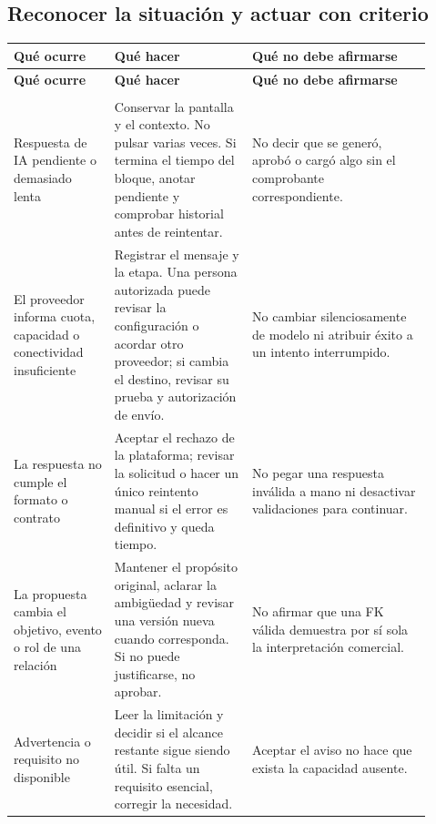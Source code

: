 \subsection{Reconocer la situación y actuar con criterio}
\begingroup
\fontsize{10}{12.5}\selectfont
\setlength{\tabcolsep}{5pt}
\renewcommand{\arraystretch}{1.15}
\begin{longtable}{@{}>{\RaggedRight\arraybackslash}p{0.22\linewidth}>{\RaggedRight\arraybackslash}p{0.3\linewidth}>{\RaggedRight\arraybackslash}p{0.39\linewidth}@{}}
\toprule
\textbf{Qué ocurre} & \textbf{Qué hacer} & \textbf{Qué no debe afirmarse} \\
\midrule
\endfirsthead
\toprule
\textbf{Qué ocurre} & \textbf{Qué hacer} & \textbf{Qué no debe afirmarse} \\
\midrule
\endhead
\midrule
\multicolumn{3}{r}{\footnotesize Continúa en la página siguiente}\\
\endfoot
\bottomrule
\endlastfoot
Respuesta de IA pendiente o demasiado lenta & Conservar la pantalla y el contexto. No pulsar varias veces. Si termina el tiempo del bloque, anotar pendiente y comprobar historial antes de reintentar. & No decir que se generó, aprobó o cargó algo sin el comprobante correspondiente. \\
\addlinespace[3pt]
El proveedor informa cuota, capacidad o conectividad insuficiente & Registrar el mensaje y la etapa. Una persona autorizada puede revisar la configuración o acordar otro proveedor; si cambia el destino, revisar su prueba y autorización de envío. & No cambiar silenciosamente de modelo ni atribuir éxito a un intento interrumpido. \\
\addlinespace[3pt]
La respuesta no cumple el formato o contrato & Aceptar el rechazo de la plataforma; revisar la solicitud o hacer un único reintento manual si el error es definitivo y queda tiempo. & No pegar una respuesta inválida a mano ni desactivar validaciones para continuar. \\
\addlinespace[3pt]
La propuesta cambia el objetivo, evento o rol de una relación & Mantener el propósito original, aclarar la ambigüedad y revisar una versión nueva cuando corresponda. Si no puede justificarse, no aprobar. & No afirmar que una FK válida demuestra por sí sola la interpretación comercial. \\
\addlinespace[3pt]
Advertencia o requisito no disponible & Leer la limitación y decidir si el alcance restante sigue siendo útil. Si falta un requisito esencial, corregir la necesidad. & Aceptar el aviso no hace que exista la capacidad ausente. \\

\end{longtable}
